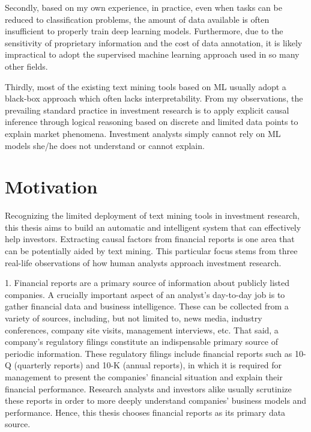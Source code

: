 Secondly, based on my own experience, in practice, even when tasks can be reduced to classification problems, the amount of data available is often insufficient to properly train deep learning models. Furthermore, due to the sensitivity of proprietary information and the cost of data annotation, it is likely impractical to adopt the supervised machine learning approach used in so many other fields. 

Thirdly, most of the existing text mining tools based on ML usually adopt a black-box approach which often lacks interpretability. From my observations, the prevailing standard practice in investment research is to apply explicit causal inference through logical reasoning based on discrete and limited data points to explain market phenomena. Investment analysts simply cannot rely on ML models she/he does not understand or cannot explain. 


\section{Motivation}

Recognizing the limited deployment of text mining tools in investment research, this thesis aims to build an automatic and intelligent system that can effectively help investors. Extracting causal factors from financial reports is one area that can be potentially aided by text mining. This particular focus stems from three real-life observations of how human analysts approach investment research. 

1. Financial reports are a primary source of information about publicly listed companies. A crucially important aspect of an analyst's day-to-day job is to gather financial data and business intelligence. These can be collected from a variety of sources, including, but not limited to, news media, industry conferences, company site visits, management interviews, etc. That said, a company's regulatory filings constitute an indispensable primary source of periodic information. These regulatory filings include financial reports such as 10-Q (quarterly reports) and 10-K (annual reports), in which it is required for management to present the companies' financial situation and explain their financial performance. Research analysts and investors alike usually scrutinize these reports in order to more deeply understand companies' business models and performance. Hence, this thesis chooses financial reports as its primary data source.

